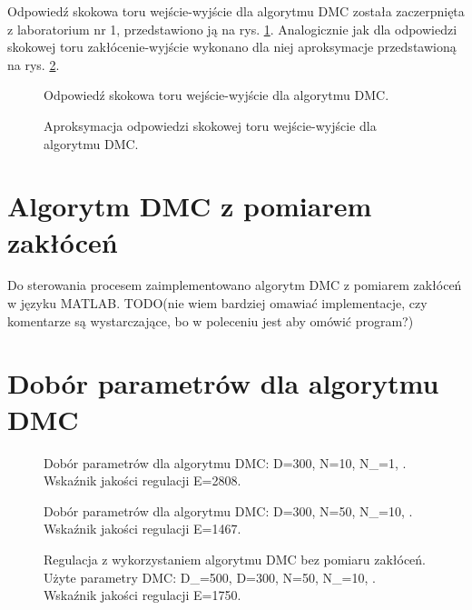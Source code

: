 \documentclass[a4paper,titlepage,11pt,twosides,floatssmall]{mwrep}
\begin{document}
Odpowiedź skokowa toru wejście-wyjście dla algorytmu DMC została zaczerpnięta z laboratorium nr 1, przedstawiono ją na rys. \ref{skok_DMC}. Analogicznie jak dla odpowiedzi skokowej toru zakłócenie-wyjście wykonano dla niej aproksymacje przedstawioną na rys. \ref{skok_DMC_apro}.

\begin{figure}[H]
	\centering
	
	\caption{Odpowiedź skokowa toru wejście-wyjście dla algorytmu DMC.}
	\label{skok_DMC}
\end{figure}

	
\begin{figure}[H]
	\centering
	
	\caption{Aproksymacja odpowiedzi skokowej toru wejście-wyjście dla algorytmu DMC.}
	\label{skok_DMC_apro}
\end{figure}

\section{Algorytm DMC z pomiarem zakłóceń}
Do sterowania procesem zaimplementowano algorytm DMC z pomiarem zakłóceń w języku MATLAB. TODO(nie wiem bardziej omawiać implementacje, czy komentarze są wystarczające, bo w poleceniu jest aby omówić program?)




\section{Dobór parametrów dla algorytmu DMC}

\begin{figure}[H]
	\centering
	
	\caption{Dobór parametrów dla algorytmu DMC: D=300, N=10, N_{}=1, .\\ Wskaźnik jakości regulacji E=2808.}
	\label{dobor_param_DMC1}
\end{figure}

\begin{figure}[H]
	\centering
	
	\caption{Dobór parametrów dla algorytmu DMC: D=300, N=50, N_{}=10, .\\ Wskaźnik jakości regulacji E=1467.}
	\label{dobor_param_DMC2}
\end{figure}

\begin{figure}[H]
	\centering
	
	\caption{Regulacja z wykorzystaniem algorytmu DMC bez pomiaru zakłóceń. \\Użyte parametry DMC: D_{}=500, D=300, N=50, N_{}=10, .\\ Wskaźnik jakości regulacji E=1750.}
	\label{bez_kom_1}
\end{figure}
\end{document}
